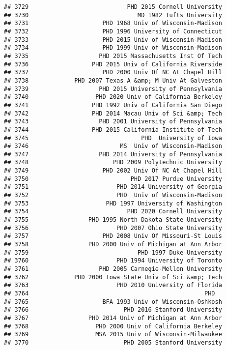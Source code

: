 \documentclass[
]{article}
\begin{document}
\begin{verbatim}
## 3729                            PHD 2015 Cornell University
## 3730                               MD 1982 Tufts University
## 3731                     PHD 1968 Univ of Wisconsin-Madison
## 3732                     PHD 1996 University of Connecticut
## 3733                     PHD 2015 Univ of Wisconsin-Madison
## 3734                     PHD 1999 Univ of Wisconsin-Madison
## 3735                    PHD 2015 Massachusetts Inst Of Tech
## 3736                  PHD 2015 Univ of California Riverside
## 3737                     PHD 2000 Univ Of NC At Chapel Hill
## 3738             PHD 2007 Texas A &amp; M Univ At Galveston
## 3739                    PHD 2015 University of Pennsylvania
## 3740                   PHD 2020 Univ of California Berkeley
## 3741                  PHD 1992 Univ of California San Diego
## 3742                  PHD 2014 Macau Univ of Sci &amp; Tech
## 3743                    PHD 2001 University of Pennsylvania
## 3744                  PHD 2015 California Institute of Tech
## 3745                                PHD  University of Iowa
## 3746                          MS  Univ of Wisconsin-Madison
## 3747                    PHD 2014 University of Pennsylvania
## 3748                        PHD 2009 Polytechnic University
## 3749                     PHD 2002 Univ Of NC At Chapel Hill
## 3750                             PHD 2017 Purdue University
## 3751                         PHD 2014 University of Georgia
## 3752                         PHD  Univ of Wisconsin-Madison
## 3753                      PHD 1997 University of Washington
## 3754                            PHD 2020 Cornell University
## 3755                 PHD 1995 North Dakota State University
## 3756                         PHD 2007 Ohio State University
## 3757                     PHD 2008 Univ Of Missouri-St Louis
## 3758                 PHD 2000 Univ of Michigan at Ann Arbor
## 3759                               PHD 1997 Duke University
## 3760                         PHD 1994 University of Toronto
## 3761                    PHD 2005 Carnegie-Mellon University
## 3762             PHD 2000 Iowa State Univ of Sci &amp; Tech
## 3763                         PHD 2010 University of Florida
## 3764                                                  PHD  
## 3765                     BFA 1993 Univ of Wisconsin-Oshkosh
## 3766                           PHD 2016 Stanford University
## 3767                 PHD 2014 Univ of Michigan at Ann Arbor
## 3768                   PHD 2000 Univ of California Berkeley
## 3769                   MSA 2015 Univ of Wisconsin-Milwaukee
## 3770                           PHD 2005 Stanford University

\end{verbatim}
\end{document}
